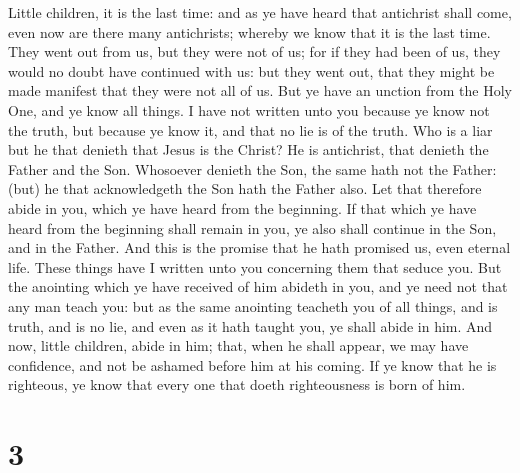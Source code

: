  Little children, it is the last time: and as ye have heard
that antichrist shall come, even now are there many antichrists; whereby
we know that it is the last time.  They went out from us,
but they were not of us; for if they had been of us, they would no doubt
have continued with us: but they went out, that they might be made
manifest that they were not all of us.  But ye have an
unction from the Holy One, and ye know all things.  I have
not written unto you because ye know not the truth, but because ye know
it, and that no lie is of the truth.  Who is a liar but he
that denieth that Jesus is the Christ? He is antichrist, that denieth
the Father and the Son.  Whosoever denieth the Son, the
same hath not the Father: (but) he that acknowledgeth the Son hath the
Father also.  Let that therefore abide in you, which ye
have heard from the beginning. If that which ye have heard from the
beginning shall remain in you, ye also shall continue in the Son, and in
the Father.  And this is the promise that he hath promised
us, even eternal life.  These things have I written unto
you concerning them that seduce you.  But the anointing
which ye have received of him abideth in you, and ye need not that any
man teach you: but as the same anointing teacheth you of all things, and
is truth, and is no lie, and even as it hath taught you, ye shall abide
in him.  And now, little children, abide in him; that, when
he shall appear, we may have confidence, and not be ashamed before him
at his coming.  If ye know that he is righteous, ye know
that every one that doeth righteousness is born of him.

\hypertarget{section-2}{%
\section{3}\label{section-2}}

